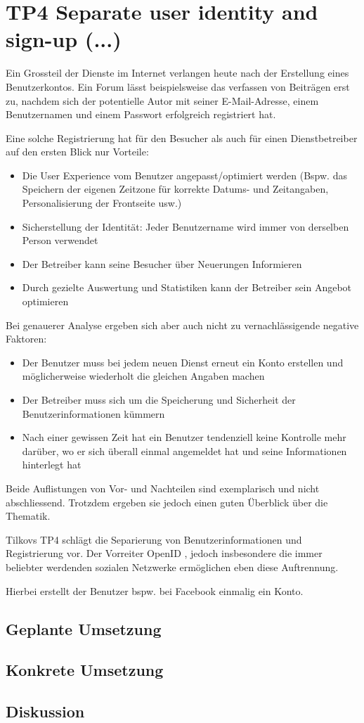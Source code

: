 \section{TP4 Separate user identity and sign-up (...)}
\label{sec:principle-tp4-seperate-user-identity}

Ein Grossteil der Dienste im Internet verlangen heute nach der Erstellung eines Benutzerkontos. Ein Forum lässt beispielsweise das verfassen von Beiträgen erst zu, nachdem sich der potentielle Autor mit seiner E-Mail-Adresse, einem Benutzernamen und einem Passwort erfolgreich registriert hat.

Eine solche Registrierung hat für den Besucher als auch für einen Dienstbetreiber auf den ersten Blick nur Vorteile:

\begin{itemize}
	\item Die User Experience vom Benutzer angepasst/optimiert werden (Bspw. das Speichern der eigenen Zeitzone für korrekte Datums- und Zeitangaben, Personalisierung der Frontseite usw.)
	\item Sicherstellung der Identität: Jeder Benutzername wird immer von derselben Person verwendet
	\item Der Betreiber kann seine Besucher über Neuerungen Informieren
	\item Durch gezielte Auswertung und Statistiken kann der Betreiber sein Angebot optimieren
\end{itemize}

Bei genauerer Analyse ergeben sich aber auch nicht zu vernachlässigende negative Faktoren:

\begin{itemize}
	\item Der Benutzer muss bei jedem neuen Dienst erneut ein Konto erstellen und möglicherweise wiederholt die gleichen Angaben machen
	\item Der Betreiber muss sich um die Speicherung und Sicherheit der Benutzerinformationen kümmern
	\item Nach einer gewissen Zeit hat ein Benutzer tendenziell keine Kontrolle mehr darüber, wo er sich überall einmal angemeldet hat und seine Informationen hinterlegt hat
\end{itemize}

Beide Auflistungen von Vor- und Nachteilen sind exemplarisch und nicht abschliessend. Trotzdem ergeben sie jedoch einen guten Überblick über die Thematik.

Tilkovs TP4 schlägt die Separierung von Benutzerinformationen und Registrierung vor. Der Vorreiter OpenID \cite{OpenID}, jedoch insbesondere die immer beliebter werdenden sozialen Netzwerke ermöglichen eben diese Auftrennung.

Hierbei erstellt der Benutzer bspw. bei Facebook einmalig ein Konto.


\subsection*{Geplante Umsetzung}


\subsection*{Konkrete Umsetzung}


\subsection*{Diskussion}
